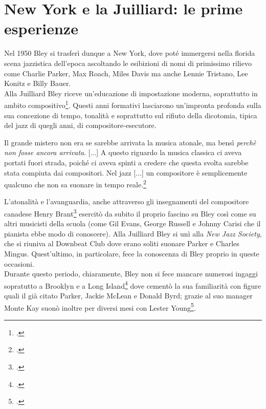\section{New York e la Juilliard: le prime esperienze}
Nel 1950 Bley si trasferì dunque a New York, dove poté immergersi nella florida scena jazzistica dell'epoca ascoltando le esibizioni di nomi di primissimo rilievo come Charlie Parker, Max Roach, Miles Davis ma anche Lennie Tristano, Lee Konitz e Billy Bauer.\\
Alla Juilliard Bley riceve un'educazione di impostazione moderna, soprattutto in ambito compositivo\footcite[23]{stopping}. Questi anni formativi lasciarono un'impronta profonda sulla sua concezione di tempo, tonalità e soprattutto sul rifiuto della dicotomia, tipica del jazz di quegli anni, di compositore-esecutore.
\begin{fquote}
	Il grande mistero non era se sarebbe arrivata la musica atonale, ma bensì \textit{perchè non fosse ancora arrivata}. [...] A questo riguardo la musica classica ci aveva portati fuori strada, poiché ci aveva spinti a credere che questa svolta sarebbe stata compiuta dai compositori. Nel jazz [...] un compositore è semplicemente qualcuno che non sa suonare in tempo reale.\footcite[24]{stopping}
\end{fquote}
L'atonalità e l'avanguardia, anche attraverso gli insegnamenti del compositore canadese Henry Brant\footcite[23]{stopping} esercitò da subito il proprio fascino su Bley così come su altri musicisti della scuola (come Gil Evans, George Russell e Johnny Carisi che il pianista ebbe modo di conoscere). Alla Juilliard Bley si unì alla \textit{New Jazz Society}, che si riuniva al Downbeat Club dove erano soliti suonare Parker e Charles Mingus. Quest'ultimo, in particolare, fece la conoscenza di Bley proprio in queste occasioni.\\
Durante questo periodo, chiaramente, Bley non si fece mancare numerosi ingaggi sopratutto a Brooklyn e a Long Island\footcite[47]{cappelletti} dove cementò la sua familiarità con figure quali il già citato Parker, Jackie McLean e Donald Byrd; grazie al suo manager Monte Kay suonò inoltre per diversi mesi con Lester Young\footcite[47]{cappelletti}.\par
